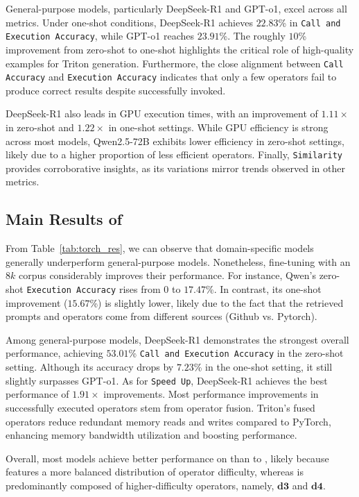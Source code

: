 General-purpose models, particularly DeepSeek-R1 and GPT-o1, excel across all metrics. 
Under one-shot conditions, DeepSeek-R1 achieves $22.83$\% in \texttt{Call and Execution Accuracy}, while GPT-o1 reaches $23.91$\%. 
The roughly $10$\% improvement from zero-shot to one-shot highlights the critical role of high-quality examples for Triton generation. 
Furthermore, the close alignment between \texttt{Call Accuracy} and \texttt{Execution Accuracy} indicates that only a few operators fail to produce correct results despite successfully invoked. 

DeepSeek-R1 also leads in GPU execution times, with an improvement of $1.11\times$ in zero-shot and $1.22\times$ in one-shot settings. 
While GPU efficiency is strong across most models, Qwen2.5-72B exhibits lower efficiency in zero-shot settings, likely due to a higher proportion of less efficient operators. 
Finally, \texttt{Similarity} provides corroborative insights, as its variations mirror trends observed in other metrics.


\subsection{Main Results of \benchtwo}
From Table~\ref{tab:torch_res}, we can observe that domain-specific models generally underperform general-purpose models. 
Nonetheless, fine-tuning with an $8k$ corpus considerably improves their performance. 
For instance, Qwen’s zero-shot \texttt{Execution Accuracy} rises from $0$ to $17.47$\%.
In contrast, its one-shot improvement ($15.67$\%) is slightly lower, likely due to the fact that the retrieved prompts and \benchtwo operators come from different sources (Github vs. Pytorch). 


Among general-purpose models, DeepSeek-R1 demonstrates the strongest overall performance, achieving $53.01$\% \texttt{Call and Execution Accuracy} in the zero-shot setting. 
Although its accuracy drops by $7.23$\% in the one-shot setting, it still slightly surpasses GPT-o1. 
As for \texttt{Speed Up}, DeepSeek-R1 achieves the best performance of $1.91\times$ improvements.
Most performance improvements in successfully executed operators stem from operator fusion. Triton’s fused operators reduce redundant memory reads and writes compared to PyTorch, enhancing memory bandwidth utilization and boosting performance.

Overall, most models achieve better performance on \benchtwo than to \benchone, likely because \benchtwo features a more balanced distribution of operator difficulty, whereas \benchone is predominantly composed of higher-difficulty operators, namely, $\mathbf{d3}$ and $\mathbf{d4}$.
